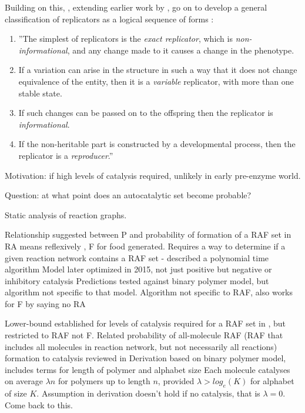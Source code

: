 Building on this, \citeauthor{Zachar2010}, extending earlier work by \textcite{Szathmary1999,Szathmary:2006ty}, go on to develop a general classification of replicators as a logical sequence of forms \parencite[p.21, line breaks and numbering added for emphasis]{Zachar2010}:  

\begin{enumerate}
	\item ''The simplest of replicators is the \emph{exact replicator}, which is \emph{non-informational}, and any change made to it causes a change in the phenotype. 
	\item If a variation can arise in the structure in such a way that it does not change equivalence of the entity, then it is a \emph{variable} replicator, with more than one stable state.
	\item If such changes can be passed on to the offspring then the replicator is \emph{informational}. 
	\item If the non-heritable part is constructed by a developmental process, then the replicator is a \emph{reproducer}.'' 
\end{enumerate}


Motivation: if high levels of catalysis required, unlikely in early pre-enzyme world.

Question: at what point does an autocatalytic set become probable?

Static analysis of reaction graphs.

Relationship suggested between P and probability of formation of a RAF set in \cite{Hordijk2004} 
RA means reflexively , F for food generated.
Requires a way to determine if a given reaction network contains a RAF set - described a polynomial time algorithm
Model later optimized in 2015, not just positive but negative or inhibitory catalysis
Predictions tested against binary polymer model, but algorithm not specific to that model.
Algorithm not specific to RAF, also works for F by saying no RA

Lower-bound established for levels of catalysis required for a RAF set in \cite{Hordijk2011}, but restricted to RAF not F.
Related probability of all-molecule RAF (RAF that includes all molecules in reaction network, but not necessarily all reactions) \cite[sect. 4]{Hordijk2011} formation to catalysis reviewed in \cite[sect. 6.1]{Hordijk2011}
Derivation based on binary polymer model, includes terms for length of polymer and alphabet size
Each molecule catalyses on average ${\lambda}n$ for polymers up to length $n$, provided $\lambda>log_e(K)$ for alphabet of size $K$.
Assumption in derivation doesn't hold if no catalysis, that is $\lambda=0$. Come back to this.

